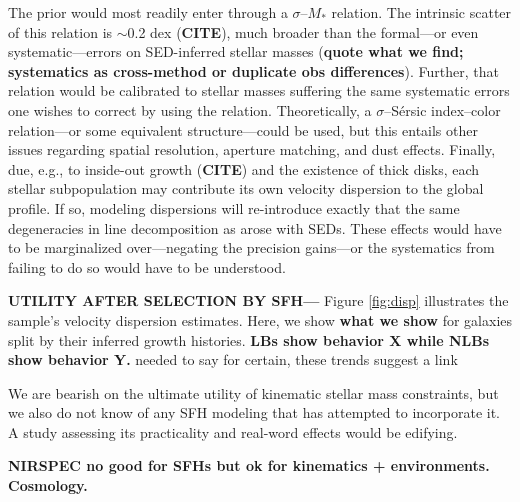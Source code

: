 \documentclass[a4paper,fleqn,usenatbib]{mnras}
\newcommand{\Mstel}{M_\ast}
\newcommand{\bfr}{\bf\color{red}}
\newcommand{\CITE}{{\bfr CITE}}
\begin{document}
The prior would most readily enter through a $\sigma$--$\Mstel$ relation. The intrinsic scatter
of this relation is $\sim$0.2 dex (\CITE), much broader than the formal---or even systematic---errors 
on SED-inferred stellar masses ({\bfr quote what we find; systematics as cross-method or duplicate
obs differences}). Further, that relation would be calibrated to stellar masses suffering the same 
systematic errors one wishes to correct by using the relation. Theoretically, a $\sigma$--S\'{e}rsic 
index--color relation---or some equivalent structure---could be used, but this entails other issues 
regarding spatial resolution, aperture matching, and dust effects. Finally, due, e.g., to inside-out 
growth (\CITE) and the existence of thick disks, each stellar subpopulation may contribute its own velocity 
dispersion to the global profile. If so, modeling dispersions will re-introduce exactly that the same 
degeneracies in line decomposition as arose with SEDs. These 
effects would have to be marginalized over---negating the precision gains---or the systematics from 
failing to do so would have to be understood.

{\bfr UTILITY AFTER SELECTION BY SFH---} Figure \ref{fig:disp} illustrates the sample's 
velocity dispersion estimates. Here, we show {\bfr what we show} for galaxies split by their inferred 
growth histories. {\bfr LBs show behavior X while NLBs show behavior Y.} %
needed to say for certain, these trends suggest a link


We are bearish on the ultimate utility of kinematic stellar mass constraints, 
but we also do not know of any SFH modeling that has attempted to incorporate it. A 
study assessing its practicality and real-word effects would be edifying.

{\bfr NIRSPEC no good for SFHs but ok for kinematics + environments. Cosmology.}
\end{document}
